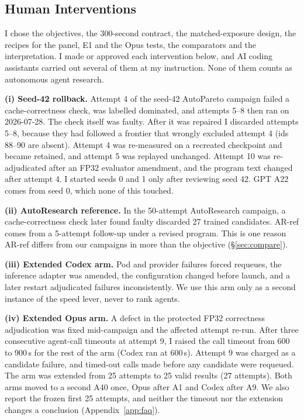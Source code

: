 \documentclass{article}
\newif\ifshowhumanmarkers \showhumanmarkersfalse
\newcommand{\humantag}[1]{{\color{humanframe}\sffamily\scriptsize\bfseries HUMAN AUTHOR MUST REWRITE/VERIFY [#1]}\ }
\newcommand{\humanauthor}[2][]{\ifshowhumanmarkers\begin{humanbox}\humantag{#1}#2\end{humanbox}\else #2\par\fi}
\begin{document}
\subsection{Human Interventions}\label{sec:interventions}
\humanauthor[P2-06 r6]{I chose the objectives, the 300-second contract, the matched-exposure design, the recipes for the panel, E1 and the Opus tests, the comparators and the interpretation. I made or approved each intervention below, and AI coding assistants carried out several of them at my instruction. None of them counts as autonomous agent research.

\textbf{(i) Seed-42 rollback.} Attempt 4 of the seed-42 AutoPareto campaign failed a cache-correctness check, was labelled dominated, and attempts 5--8 then ran on 2026-07-28. The check itself was faulty. After it was repaired I discarded attempts 5--8, because they had followed a frontier that wrongly excluded attempt 4 (ids 88--90 are absent). Attempt 4 was re-measured on a recreated checkpoint and became retained, and attempt 5 was replayed unchanged. Attempt 10 was re-adjudicated after an FP32 evaluator amendment, and the program text changed after attempt 4. I started seeds 0 and 1 only after reviewing seed 42. GPT A22 comes from seed 0, which none of this touched.

\textbf{(ii) AutoResearch reference.} In the 50-attempt AutoResearch campaign, a cache-correctness check later found faulty discarded 27 trained candidates. AR-ref comes from a 5-attempt follow-up under a revised program. This is one reason AR-ref differs from our campaigns in more than the objective (\S\ref{sec:compare}).

\textbf{(iii) Extended Codex arm.} Pod and provider failures forced requeues, the inference adapter was amended, the configuration changed before launch, and a later restart adjudicated failures inconsistently. We use this arm only as a second instance of the speed lever, never to rank agents.

\textbf{(iv) Extended Opus arm.} A defect in the protected FP32 correctness adjudication was fixed mid-campaign and the affected attempt re-run. After three consecutive agent-call timeouts at attempt 9, I raised the call timeout from 600 to 900\,s for the rest of the arm (Codex ran at 600\,s). Attempt 9 was charged as a candidate failure, and timed-out calls made before any candidate were requeued. The arm was extended from 25 attempts to 25 valid results (27 attempts). Both arms moved to a second A40 once, Opus after A1 and Codex after A9. We also report the frozen first 25 attempts, and neither the timeout nor the extension changes a conclusion (Appendix~\ref{app:faq}).

}
\end{document}
